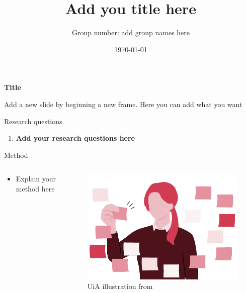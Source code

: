 \documentclass[10pt,aspectratio=169]{beamer}
\title{
\vspace{1.5em}
Add you title here}
\author{Group number: add group names here}
\institute[COMP]{Department of Engineering and Sciences
}
\date{\today}
\begin{document}
\maketitle %


\begin{frame}{\textbf{Title}}

Add a new slide by beginning a new frame. Here you can add what you want

\end{frame}



\begin{frame}{Research questions}
    \begin{enumerate}
        \item \textbf{Add your research questions here}
    \end{enumerate}
\end{frame}


\begin{frame}{Method}

\begin{columns}
    \begin{column}{0.5\textwidth}
        \begin{itemize}
            \item Explain your method here
\end{itemize}
    \end{column}

    \begin{column}{0.5\textwidth}
    \vspace{-1.8em}
    \begin{figure}
        \includegraphics[width=0.95\linewidth]{source/post-it lapper.pdf}
        \vspace{-1em}
        \caption{UiA illustration from \cite{uia_illustrasjoner}}
    \end{figure}
\end{column}

\end{columns}

\end{frame}
\end{document}
